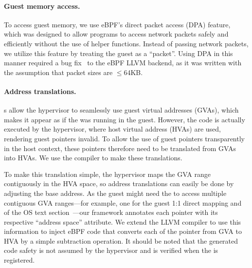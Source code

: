 \documentclass[11pt]{article}
\begin{document}
\paragraph{Guest memory access.}

To access guest memory, we use eBPF's direct packet 
access (DPA) feature, which was designed to allow programs to access network
packets safely and efficiently without the use of helper functions.
Instead of passing network packets, we utilize this feature by treating the 
 guest as a ``packet''. Using DPA in this manner required a bug 
 fix~\cite{amit17llvm} to the eBPF LLVM backend, as it was written with
 the assumption that packet sizes are $\leq$64KB.


\paragraph{Address translations.}

\Hypercallback{}s allow the hypervisor to seamlessly use guest virtual
addresses (GVAs), which makes it
appear as if the \hypercallback{} was running in the guest. However, the code is actually executed by the
hypervisor, where host virtual address (HVAs) are used, rendering guest pointers invalid.
To allow the use of guest pointers transparently in the host context, these pointers therefore
need to be translated from GVAs into HVAs. We use the compiler to make these translations.

To make this translation simple, the hypervisor maps the GVA range contiguously
in the HVA space, so address translations can easily be done by adjusting the base address.
As the guest might need the \hypercallback{} to access multiple contiguous GVA 
ranges---for example, one for the guest 1:1 direct mapping and of the OS text section~\cite{kleen04map}---our framework
annotates each pointer with its respective ``address space'' attribute. We extend the LLVM compiler
to use this information to inject eBPF code that converts each of the pointer from
GVA to HVA by a simple subtraction operation. It should be noted that the generated code safety
is not assumed by the hypervisor and is verified when the \hypercallback{} 
is registered.


\end{document}
